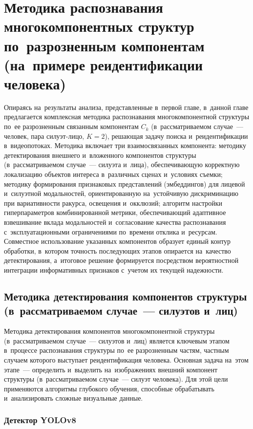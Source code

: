 \chapter{Методика распознавания многокомпонентных структур по~разрозненным компонентам (на~примере реидентификации человека)}\label{ch:ch2}

Опираясь на~результаты анализа, представленные в~первой главе, в~данной
главе предлагается комплексная методика распознавания многокомпонентной
структуры по~ее разрозненным связанным компонентам $C_k$ (в~рассматриваемом
случае~--- человек, пара силуэт-лицо, $K=2$), решающая задачу поиска
и~реидентификации в~видеопотоках. Методика включает три
взаимосвязанных компонента: методику детектирования внешнего и~вложенного
компонентов структуры (в~рассматриваемом случае~--- силуэта и~лица),
обеспечивающую корректную локализацию объектов интереса в~различных
сценах и~условиях съемки; методику формирования признаковых представлений
(эмбеддингов) для лицевой и~силуэтной модальностей, ориентированную
на~устойчивую дискриминацию при вариативности ракурса, освещения
и~окклюзий; алгоритм настройки гиперпараметров комбинированной метрики,
обеспечивающий адаптивное взвешивание вклада модальностей и~согласование
качества распознавания с~эксплуатационными ограничениями по~времени
отклика и~ресурсам. Совместное использование указанных компонентов
образует единый контур обработки, в~котором точность последующих этапов
опирается на~качество детектирования, а~итоговое решение формируется
посредством вероятностной интеграции информативных признаков с~учетом
их текущей надежности.

\section{Методика детектирования компонентов структуры (в~рассматриваемом случае~--- силуэтов и~лиц)}\label{sec:ch2/detect}

Методика детектирования компонентов многокомпонентной структуры
(в~рассматриваемом случае~--- силуэтов и~лиц) является ключевым этапом
в~процессе распознавания структуры по~ее разрозненным частям, частным
случаем которого выступает реидентификация человека. Основная задача
на~этом этапе~--- определить и~выделить на~изображениях внешний компонент
структуры (в~рассматриваемом случае~--- силуэт человека). Для этой цели применяются алгоритмы глубокого обучения,
способные обрабатывать и~анализировать сложные визуальные данные.

\subsection{Детектор YOLOv8}\label{sec:ch2/yolov8}

